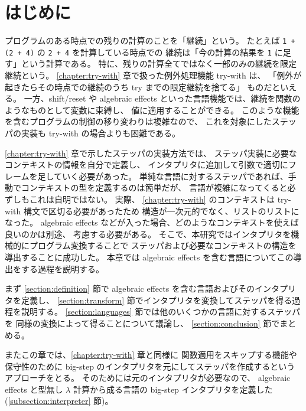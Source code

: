 \section{はじめに}
\label{section:algebraic effects__intro}

プログラムのある時点での残りの計算のことを「継続」という。
たとえば \texttt{1 + (2 + 4)} の \texttt{2 + 4} を計算している時点での
継続は「今の計算の結果を \texttt{1} に足す」という計算である。
特に、残りの計算全てではなく一部のみの継続を限定継続という。
\ref{chapter:try-with} 章で扱った例外処理機能 try-with は、
「例外が起きたらその時点での継続のうち try までの限定継続を捨てる」
ものだといえる。
一方、shift/reset \cite{DF1990} や algebraic effects \cite{PRETNAR201519}
といった言語機能では、継続を関数のようなものとして変数に束縛し、
値に適用することができる。
このような機能を含むプログラムの制御の移り変わりは複雑なので、
これを対象にしたステッパの実装も try-with の場合よりも困難である。

\ref{chapter:try-with} 章で示したステッパの実装方法では、
ステッパ実装に必要なコンテキストの情報を自分で定義し、
インタプリタに追加して引数で適切にフレームを足していく必要があった。
単純な言語に対するステッパであれば、手動でコンテキストの型を定義するのは簡単だが、
言語が複雑になってくると必ずしもこれは自明ではない。
実際、 \ref{chapter:try-with} のコンテキストは try-with 構文で区切る必要があったため
構造が一次元的でなく、リストのリストになった。
algebraic effects などが入った場合、どのようなコンテキストを使えば良いのかは別途、
考慮する必要がある。
そこで、本研究ではインタプリタを機械的にプログラム変換することで
ステッパおよび必要なコンテキストの構造を導出することに成功した。
本章では algebraic effects を含む言語についてこの導出をする過程を説明する。

まず \ref{section:definition} 節で algebraic effects を含む言語およびそのインタプリタを定義し、
\ref{section:transform} 節でインタプリタを変換してステッパを得る過程を説明する。
\ref{section:languages} 節では他のいくつかの言語に対するステッパを
同様の変換によって得ることについて議論し、
\ref{section:conclusion} 節でまとめる。

またこの章では、\ref{chapter:try-with} 章と同様に
関数適用をスキップする機能や保守性のために
big-step のインタプリタを元にしてステッパを作成するというアプローチをとる。
そのためには元のインタプリタが必要なので、
algebraic effects と型無し $\lambda$ 計算から成る言語の
big-step インタプリタを定義した (\ref{subsection:interpreter} 節)。

